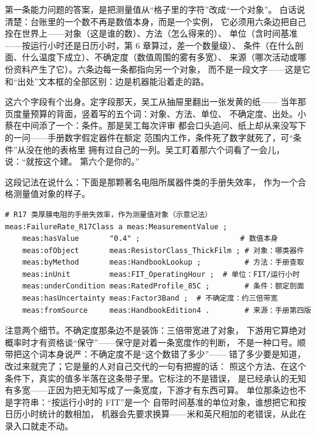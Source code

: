第一条能力问题的答案，是把测量值从“格子里的字符”改成“一个对象”。
白话说清楚：台账里的一个数不再是数值本身，而是一个实例，
它必须用六条边把自己拴在世界上——对象（这是谁的数）、方法（怎么得来的）、
单位（含时间基准——按运行小时还是日历小时，第 6 章算过，差一个数量级）、
条件（在什么剖面、什么温度下成立）、不确定度（数值周围的雾有多宽）、
来源（哪次活动或哪份资料产生了它）。六条边每一条都指向另一个对象，
而不是一段文字——这是它和“出处”文本框的全部区别：边是机器能沿着走的路。

这六个字段有个出身。定字段那天，吴工从抽屉里翻出一张发黄的纸——
当年那页度量预算的背面，竖着写的五个词：对象、方法、单位、
不确定度、出处。小蔡在中间添了一个：条件。那是吴工每次评审
都会口头追问、纸上却从来没写下的一问——手册数字假定器件在额定
范围内工作，条件死了数字就死了，可“条件”从没在他的表格里
拥有过自己的一列。吴工盯着那六个词看了一会儿，说：“就按这个建。
第六个是你的。”

这段记法在说什么：下面是那颗著名电阻所属器件类的手册失效率，
作为一个合格测量值对象的样子。

\nopagebreak[4]
\begin{codebox}
\begin{Verbatim}[fontsize=\small,breaklines=true,breakanywhere=true,breaksymbolleft={},breaksymbolright={}]
# R17 类厚膜电阻的手册失效率，作为测量值对象（示意记法）
meas:FailureRate_R17Class a meas:MeasurementValue ;
    meas:hasValue       "0.4" ;                       # 数值本身
    meas:ofObject       meas:ResistorClass_ThickFilm ; # 对象：哪类器件
    meas:byMethod       meas:HandbookLookup ;          # 方法：手册查取
    meas:inUnit         meas:FIT_OperatingHour ;  # 单位：FIT/运行小时
    meas:underCondition meas:RatedProfile_85C ;        # 条件：额定剖面
    meas:hasUncertainty meas:Factor3Band ;  # 不确定度：约三倍带宽
    meas:fromSource     meas:HandbookEdition4 .        # 来源：手册第四版
\end{Verbatim}
\end{codebox}

注意两个细节。不确定度那条边不是装饰：三倍带宽进了对象，
下游用它算绝对概率时才有资格谈“保守”——保守是对着一条宽度作的判断，
不是一种口号。顺带把这个词本身说严：不确定度不是“这个数错了多少”——
错了多少要是知道，改过来就完了；它是量的人对自己交代的一句有把握的话：
照这个方法、在这个条件下，真实的值多半落在这条带子里。它标注的不是错误，
是已经承认的无知有多宽——正因为把无知写成了一条宽度，下游才有东西可算。
单位那条边也不是字符串：“按运行小时的 FIT”是一个
自带时间基准的单位对象，谁想把它和按日历小时统计的数相加，
机器会先要求换算——米和英尺相加的老错误，从此在录入口就走不动。

